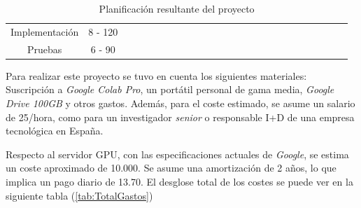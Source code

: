 \begin{table}[H]
{\begin{tabular}{|c|c|ll|llll|llll|lllll|llll|llll|}
Implementación & 8 - 120 &  &  &  &  &  &  &  &  &  \cellcolor[HTML]{9B9B9B} & \cellcolor[HTML]{9B9B9B} & \cellcolor[HTML]{9B9B9B} & \cellcolor[HTML]{9B9B9B} & &  & \cellcolor[HTML]{9B9B9B}  & \cellcolor[HTML]{9B9B9B}  & & & \cellcolor[HTML]{9B9B9B} & \cellcolor[HTML]{9B9B9B} &  &  &  \\ \cline{1-1}
Pruebas & 6 - 90 &  &  &  &  &  &  &  &  &  &  &  &  & \cellcolor[HTML]{9B9B9B}   & \cellcolor[HTML]{9B9B9B} & & & \cellcolor[HTML]{9B9B9B} & \cellcolor[HTML]{9B9B9B} &  &  & \cellcolor[HTML]{9B9B9B} & \cellcolor[HTML]{9B9B9B} & \\ \hline
\end{tabular}%
}
\caption{Planificación resultante del proyecto}
\label{tab:PlanificacionFinal}
\end{table}

Para realizar este proyecto se tuvo en cuenta los siguientes materiales:
Suscripción a \emph{Google Colab Pro}, un portátil personal de gama media, 
\emph{Google Drive 100GB} y otros gastos. 
Además, para el coste estimado, se asume un salario de 25\officialeuro/hora, como para un investigador \emph{senior} o
responsable I+D de una empresa tecnológica en España. 
 
Respecto al servidor GPU, con las especificaciones actuales de \emph{Google}, 
se estima un coste aproximado de 10.000\officialeuro. Se asume una amortización de 2 años, 
lo que implica un pago diario de 13.70\officialeuro. El desglose total de los costes 
se puede ver en la siguiente tabla (\ref{tab:TotalGastos})

